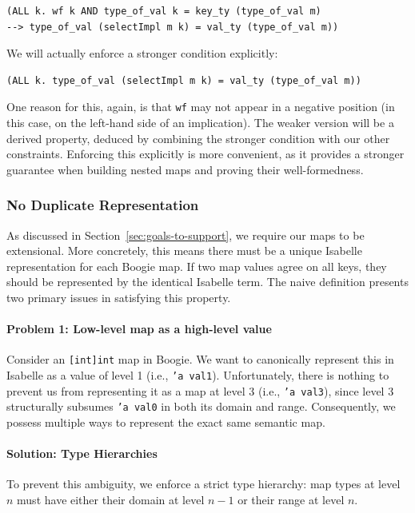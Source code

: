 \documentclass[11pt]{article}
\begin{document}
\begin{verbatim}
(ALL k. wf k AND type_of_val k = key_ty (type_of_val m)
--> type_of_val (selectImpl m k) = val_ty (type_of_val m))
\end{verbatim}


We will actually enforce a stronger condition explicitly:

\begin{verbatim}
(ALL k. type_of_val (selectImpl m k) = val_ty (type_of_val m))
\end{verbatim}

One reason for this, again, is that \texttt{wf} may not appear in a negative position
(in this case, on the left-hand side of an implication).
The weaker version will be a derived property, deduced by combining the stronger condition with our other constraints.
Enforcing this explicitly is more convenient, as it provides a stronger guarantee when building nested maps and proving their well-formedness.


\subsubsection{No Duplicate Representation}
\label{sec:no-duplicate}

As discussed in Section~\ref{sec:goals-to-support}, we require our maps to be extensional.
More concretely, this means there must be a unique Isabelle representation for each Boogie map.
If two map values agree on all keys, they should be represented by the identical Isabelle term.
The naive definition presents two primary issues in satisfying this property.

\paragraph{Problem 1: Low-level map as a high-level value}
Consider an \texttt{[int]int} map in Boogie.
We want to canonically represent this in Isabelle as a value of level 1 (i.e., \texttt{'a val1}).
Unfortunately, there is nothing to prevent us from representing it as a map at level 3 (i.e., \texttt{'a val3}), since level 3 structurally subsumes \texttt{'a val0} in both its domain and range.
Consequently, we possess multiple ways to represent the exact same semantic map.

\paragraph{Solution: Type Hierarchies}
To prevent this ambiguity, we enforce a strict type hierarchy: map types at level $n$ must have either their domain at level $n-1$ or their range at level $n$.
\end{document}
